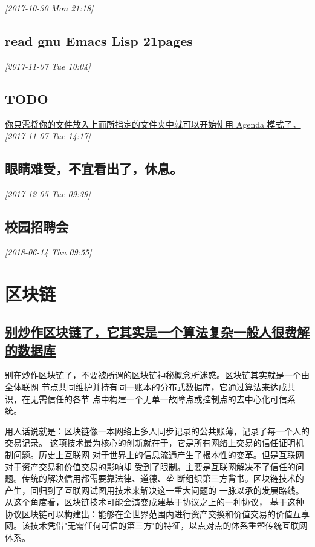 \documentclass[11pt]{ctexart}
\begin{document}
\textit{[2017-10-30 Mon 21:18]}

\subsection{read gnu Emacs Lisp 21pages}
\label{sec:orgba7d5de}

\textit{[2017-11-07 Tue 10:04]}

\subsection{{\bfseries\sffamily TODO} }
\label{sec:org2bc1a76}

\href{file:///Users/mac/org-notes/notes.org}{你只需将你的文件放入上面所指定的文件夹中就可以开始使用 Agenda 模式了。}
\textit{[2017-11-07 Tue 14:17]}

\subsection{眼睛难受，不宜看出了，休息。}
\label{sec:org0342473}

\textit{[2017-12-05 Tue 09:39]}

\subsection{校园招聘会}
\label{sec:org2b7725a}

\textit{[2018-06-14 Thu 09:55]}

\section{区块链}
\label{sec:orgd690561}
\subsection{\href{http://www.sohu.com/a/228894640\_182338}{别炒作区块链了，它其实是一个算法复杂一般人很费解的数据库}}
\label{sec:org86bcf7c}
别在炒作区块链了，不要被所谓的区块链神秘概念所迷惑。区块链其实就是一个由全体联网
节点共同维护并持有同一账本的分布式数据库，它通过算法来达成共识，在无需信任的各节
点中构建一个无单一故障点或控制点的去中心化可信系统。

用人话说就是：区块链像一本网络上多人同步记录的公共账薄，记录了每一个人的交易记录。
这项技术最为核心的创新就在于，它是所有网络上交易的信任证明机制问题。历史上互联网
对于世界上的信息流通产生了根本性的变革。但是互联网对于资产交易和价值交易的影响却
受到了限制。主要是互联网解决不了信任的问题。传统的解决信用都需要靠法律、道德、垄
断组织第三方背书。区块链技术的产生，回归到了互联网试图用技术来解决这一重大问题的
一脉以承的发展路线。从这个角度看，区块链技术可能会演变成建基于协议之上的一种协议，
基于这种协议区块链可以构建出：能够在全世界范围内进行资产交换和价值交易的价值互享
网。该技术凭借"无需任何可信的第三方"的特征，以点对点的体系重塑传统互联网体系。
\end{document}
